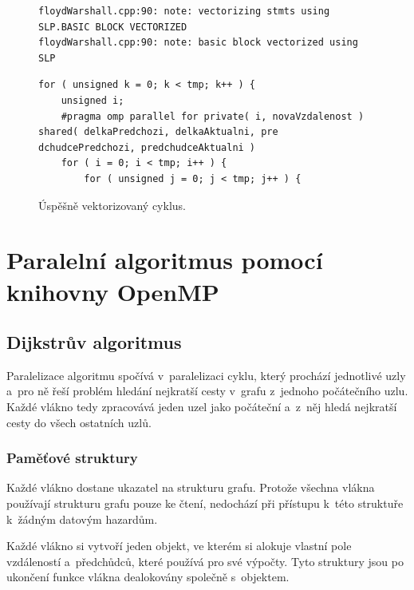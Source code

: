 \begin{figure}
    \centering
    \caption{Úspěšně vektorizovaný cyklus.}
	\label{f:fw:vect1}
    \begin{lstlisting}
floydWarshall.cpp:90: note: vectorizing stmts using SLP.BASIC BLOCK VECTORIZED
floydWarshall.cpp:90: note: basic block vectorized using SLP
    \end{lstlisting}
    
	\begin{lstlisting}
for ( unsigned k = 0; k < tmp; k++ ) {
	unsigned i;
	#pragma omp parallel for private( i, novaVzdalenost ) shared( delkaPredchozi, delkaAktualni, pre    dchudcePredchozi, predchudceAktualni )
	for ( i = 0; i < tmp; i++ ) {
		for ( unsigned j = 0; j < tmp; j++ ) {
	\end{lstlisting}
\end{figure}




\section{Paralelní algoritmus pomocí knihovny OpenMP}

\subsection{Dijkstrův algoritmus}
Paralelizace algoritmu spočívá v~paralelizaci cyklu, který prochází jednotlivé uzly a~pro ně řeší problém hledání nejkratší cesty v~grafu z~jednoho počátečního uzlu. Každé vlákno tedy zpracovává jeden uzel jako počáteční a~z~něj hledá nejkratší cesty do všech ostatních uzlů.

\subsubsection{Paměťové struktury}
Každé vlákno dostane ukazatel na strukturu grafu. Protože všechna vlákna používají strukturu grafu pouze ke čtení, nedochází při přístupu k~této struktuře k~žádným datovým hazardům.

Každé vlákno si vytvoří jeden objekt, ve kterém si alokuje vlastní pole vzdáleností a~předchůdců, které používá pro své výpočty. Tyto struktury jsou po ukončení funkce vlákna dealokovány společně s~objektem.

